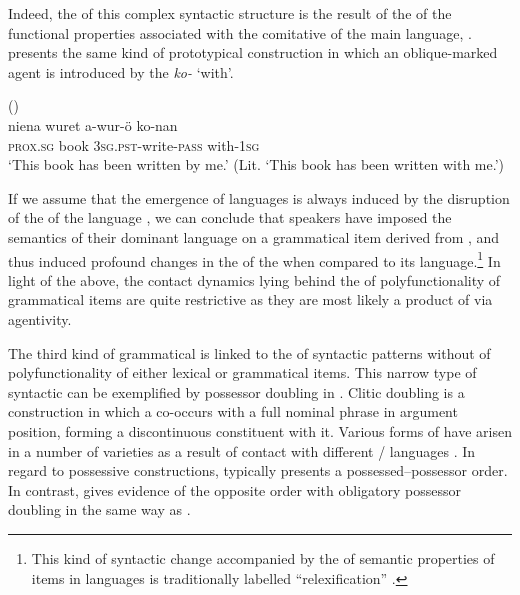 \documentclass[output=paper]{langsci/langscibook}
\begin{document}
Indeed, the  of this complex syntactic structure is the result of the  of the functional properties associated with the comitative  of the main  language, .  presents the same kind of prototypical  construction in which an oblique-marked agent is introduced by the  \textit{ko-} ‘with’.

\ea
{ (\citealt[65]{Owen1909})}\\
\gll   niena  wuret   a-wur-ö ko-nan \\
       \textsc{prox.sg} book \textsc{3sg.pst}-write-\textsc{pass} with-\textsc{1sg}\\
\glt   `This book has been written by me.' (Lit. ‘This book has been written with me.’)
\z

If we assume that the emergence of  languages is always induced by the disruption of the  of the  language \citep{Comrie2011}, we can conclude that  speakers have imposed the semantics of their dominant language on a grammatical item derived from , and thus induced profound changes in the  of the  when compared to its  language.\footnote{This kind of syntactic change accompanied by the  of semantic properties of  items in  languages is traditionally labelled ``relexification'' \citep{Lefebvre1998}.}  In light of the above, the contact dynamics lying behind the  of polyfunctionality of grammatical items are quite restrictive as they are most likely a product of  via  agentivity.  

The third kind of grammatical  is linked to the  of syntactic patterns without  of polyfunctionality of either lexical or grammatical items. This narrow type of syntactic  can be exemplified by possessor doubling in   \citep{Ratcliffe2005}. Clitic doubling is a construction in which a  co-occurs with a full nominal phrase in argument position, forming a discontinuous constituent with it. Various forms of  have arisen in a number of  varieties as a result of contact with different / languages \citep{Souag2017clitic}. In regard to possessive constructions,  typically presents a possessed–possessor order. In contrast,    gives evidence of the opposite order with obligatory possessor doubling in the same way as  . 
\end{document}
